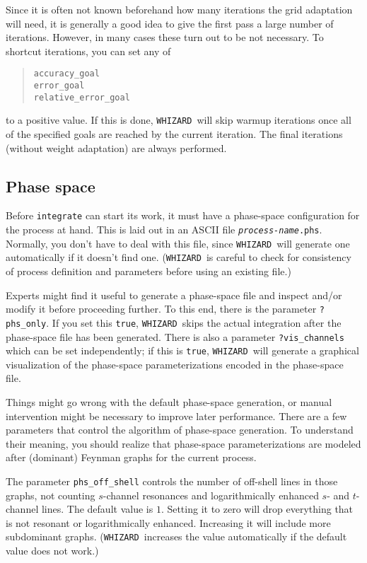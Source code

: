 \documentclass[12pt]{book}
\newcommand{\ttt}[1]{\texttt{#1}}
\newcommand{\whizard}{\texttt{WHIZARD}}
\begin{document}
Since it is often not known beforehand how many iterations the grid
adaptation will need, it is generally a good idea to give the first
pass a large number of iterations.  However, in many cases these turn
out to be not necessary.  To shortcut iterations, you can set any of
\begin{quote}
\begin{footnotesize}
\begin{verbatim}
accuracy_goal
error_goal
relative_error_goal
\end{verbatim}
\end{footnotesize}
\end{quote}
to a positive value.  If this is done, \whizard\ will skip warmup
iterations once all of the specified goals are reached by the current
iteration.  The final iterations (without weight adaptation) are
always performed.


\subsection{Phase space}

Before \ttt{integrate} can start its work, it must have a phase-space
configuration for the process at hand.  This is laid out in an ASCII file
\ttt{\textit{process-name}.phs}.  Normally, you don't have to deal with this
file, since \whizard\ will generate one automatically if it doesn't find one.
(\whizard\ is careful to check for consistency of process definition and
parameters before using an existing file.)  

Experts might find it useful to generate a phase-space file and inspect and/or
modify it before proceeding further.  To this end, there is the parameter
\verb|?phs_only|.  If you set this \ttt{true}, \whizard\ skips the actual
integration after the phase-space file has been generated.  There is also a
parameter \verb|?vis_channels| which can be set independently; if this is
\ttt{true}, \whizard\ will generate a graphical visualization of the
phase-space parameterizations encoded in the phase-space file.

Things might go wrong with the default phase-space generation, or manual
intervention might be necessary to improve later performance.  There are a few
parameters that control the algorithm of phase-space generation.  To
understand their meaning, you should realize that phase-space
parameterizations are modeled after (dominant) Feynman graphs for the current
process.  

The parameter \verb|phs_off_shell| controls the number of off-shell lines in
those graphs, not counting $s$-channel resonances and logarithmically enhanced
$s$- and $t$-channel lines.  The default value is $1$.  Setting it to zero
will drop everything that is not resonant or logarithmically enhanced.
Increasing it will include more subdominant graphs.  (\whizard\ increases the
value automatically if the default value does not work.)
\end{document}
